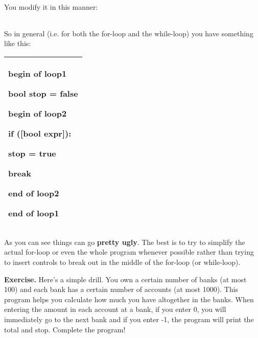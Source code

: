 \documentclass[
]{article}
\begin{document}
You modify it in this manner:

\begin{longtable}[]{@{}@{}}
\toprule
\endhead
\bottomrule
\end{longtable}

So in general (i.e. for both the for-loop and the while-loop) you have
something like this:

\begin{longtable}[]{@{}l@{}}
\toprule
\endhead
\begin{minipage}[t]{0.97\columnwidth}\raggedright
begin of loop1

bool stop = false

begin of loop2

if ({[}bool expr{]}):

stop = true

break

end of loop2

end of loop1\strut
\end{minipage}\tabularnewline
\bottomrule
\end{longtable}

As you can see things can go \textbf{pretty ugly}. The best is to try to
simplify the actual for-loop or even the whole program whenever possible
rather than trying to insert controls to break out in the middle of the
for-loop (or while-loop).

\textbf{Exercise.} Here's a simple drill. You own a certain number of
banks (at most 100) and each bank has a certain number of accounts (at
most 1000). This program helps you calculate how much you have
altogether in the banks. When entering the amount in each account at a
bank, if you enter 0, you will immediately go to the next bank and if
you enter -1, the program will print the total and stop. Complete the
program!
\end{document}
